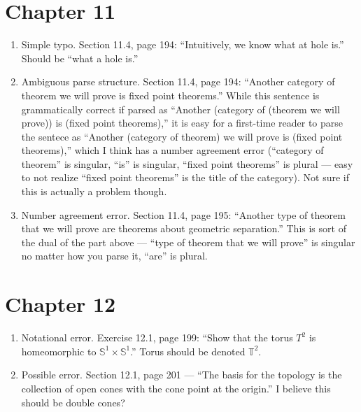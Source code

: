\documentclass{fkletter}
\begin{document}
\section*{Chapter 11}
\begin{enumerate}
  \item Simple typo. Section 11.4, page 194: ``Intuitively, we know what
    {\color{red} at} hole is.'' Should be ``what {\color{green} a} hole is.''
  \item Ambiguous parse structure. Section 11.4, page 194: ``Another category of
    theorem we will prove is fixed point theorems.'' While this sentence is
    grammatically correct if parsed as ``Another (category of (theorem we will
    prove)) is (fixed point theorems),'' it is easy for a first-time reader to
    parse the sentece as ``Another (category of theorem) we will prove is (fixed
    point theorems),'' which I think has a number agreement error (``category of
    theorem'' is singular, ``is'' is singular, ``fixed point theorems'' is
    plural --- easy to not realize ``fixed point theorems'' is the title of the
    category). Not sure if this is actually a problem though.
  \item Number agreement error. Section 11.4, page 195: ``Another type of
    theorem that we will prove {\color{red} are} theorems about geometric
    separation.'' This is sort of the dual of the part above --- ``type of
    theorem that we will prove'' is singular no matter how you parse it, ``are''
    is plural.
\end{enumerate}
\section*{Chapter 12}
\begin{enumerate}
  \item Notational error. Exercise 12.1, page 199: ``Show that the torus
    {\color{red}$T^2$} is homeomorphic to $\mathbb{S}^1 \times \mathbb{S}^1$.''
    Torus should be denoted $\mathbb{T}^2$.
  \item Possible error. Section 12.1, page 201 --- ``The basis for the topology
    is the collection of {\color{red}open cones} with the cone point at the
    origin.'' I believe this should be double cones?
\end{enumerate}
\end{document}
